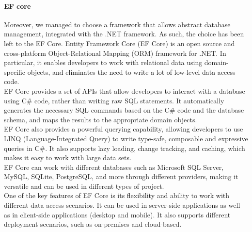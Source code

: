 \paragraph{EF core}
Moreover, we managed to choose a framework that allows abstract database management, integrated with the .NET framework. As such, the choice has been left to the EF Core.
Entity Framework Core (EF Core) is an open source and cross-platform Object-Relational Mapping (ORM) framework for .NET. In particular, it enables developers to work with relational data using domain-specific objects, and eliminates the need to write a lot of low-level data access code.
\\ EF Core provides a set of APIs that allow developers to interact with a database using C\# code, rather than writing raw SQL statements. It automatically generates the necessary SQL commands based on the C\# code and the database schema, and maps the results to the appropriate domain objects.
\\ EF Core also provides a powerful querying capability, allowing developers to use LINQ (Language-Integrated Query) to write type-safe, composable and expressive queries in C\#. It also supports lazy loading, change tracking, and caching, which makes it easy to work with large data sets.
\\ EF Core can work with different databases such as Microsoft SQL Server, MySQL, SQLite, PostgreSQL, and more through different providers, making it versatile and can be used in different types of project.
\\ One of the key features of EF Core is its flexibility and ability to work with different data access scenarios. It can be used in server-side applications as well as in client-side applications (desktop and mobile). It also supports different deployment scenarios, such as on-premises and cloud-based.

